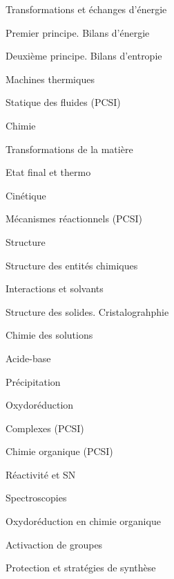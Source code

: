 \begin{multicols}{2}
\begin{programme}
\begin{programme}
        \item Transformations et échanges d'énergie
        \item Premier principe. Bilans d'énergie
        \item Deuxième principe. Bilans d'entropie
        \item Machines thermiques
        \item Statique des fluides (PCSI)
    \end{programme}
    \item Chimie
    \begin{programme}
        \item Transformations de la matière
        \begin{programme}
            \item Etat final et thermo
            \item Cinétique
            \item Mécanismes réactionnels (PCSI)
        \end{programme}
        \item Structure
        \begin{programme}
            \item Structure des entités chimiques
            \item Interactions et solvants
        \end{programme}
        \item Structure des solides. Cristalograhphie
        \item Chimie des solutions
        \begin{programme}
            \item Acide-base
            \item Précipitation
            \item Oxydoréduction
            \item Complexes (PCSI)
        \end{programme}
        \item Chimie organique (PCSI)
        \begin{programme}
            \item Réactivité et SN
            \item Spectroscopies
            \item Oxydoréduction en chimie organique
            \item Activaction de groupes
            \item Protection et stratégies de synthèse
        \end{programme}
    \end{programme}
    
\end{programme}
\end{multicols}

